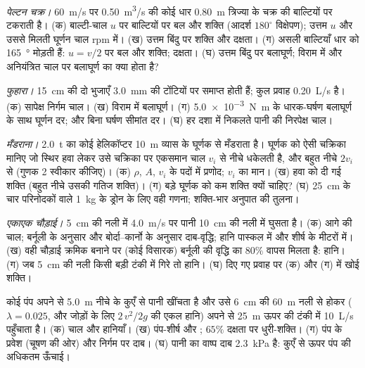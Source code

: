\begin{exercise}[$\star\star$]\label{exo:b2:flow-balances:5}
\emph{पेल्टन चक्र।} \qty{60}{m/s} पर \qty{0.50}{m^3/s} की कोई धार
\qty{0.80}{m} त्रिज्या के चक्र की बाल्टियों पर टकराती है। (क) बाल्टी-चाल $u$ पर
बाल्टियों पर बल और शक्ति (आदर्श $180^\circ$ विक्षेपण); उत्तम $u$
और उससे मिलती घूर्णन चाल \unit{rpm} में। (ख) उत्तम बिंदु पर शक्ति और दक्षता।
(ग) असली बाल्टियाँ धार को \qty{165}{\degree} मोड़ती हैं:
$u = v/2$ पर बल और शक्ति; दक्षता। (घ) उत्तम बिंदु पर बलाघूर्ण;
विराम में और अनियंत्रित चाल पर बलाघूर्ण का क्या होता है?
\end{exercise}

\begin{exercise}[$\star\star$]\label{exo:b2:flow-balances:6}
\emph{फुहारा।} \qty{15}{cm} की दो भुजाएँ \qty{3.0}{mm} की टोंटियों पर समाप्त होती हैं;
कुल प्रवाह \qty{0.20}{L/s} है। (क) सापेक्ष निर्गम चाल। (ख) विराम में
बलाघूर्ण। (ग) \qty{5.0e-3}{N.m} के धारक-घर्षण बलाघूर्ण के साथ
घूर्णन दर; और बिना घर्षण सीमांत दर। (घ) हर दशा में निकलते
पानी की निरपेक्ष चाल।
\end{exercise}

\begin{exercise}[$\star\star$]\label{exo:b2:flow-balances:7}
\emph{मँडराना।} \qty{2.0}{t} का कोई हेलिकॉप्टर \qty{10}{m} व्यास के
घूर्णक से मँडराता है। घूर्णक को ऐसी चक्रिका मानिए जो स्थिर हवा लेकर
उसे चक्रिका पर एकसमान चाल $v_i$ से नीचे धकेलती है, और बहुत नीचे $2v_i$ से
(गुणक 2 स्वीकार कीजिए)। (क) $\rho$, $A$, $v_i$ के पदों में प्रणोद;
$v_i$ का मान। (ख) हवा को दी गई शक्ति (बहुत नीचे उसकी गतिज
शक्ति)। (ग) बड़े घूर्णक को कम शक्ति क्यों चाहिए? (घ) \qty{25}{cm} के चार
परिनोदकों वाले \qty{1}{kg} के ड्रोन के लिए वही गणना;
शक्ति-भार अनुपात की तुलना।
\end{exercise}

\begin{exercise}[$\star\star$]\label{exo:b2:flow-balances:8}
\emph{एकाएक चौड़ाई।} \qty{5}{cm} की नली में \qty{4.0}{m/s} पर पानी
\qty{10}{cm} की नली में घुसता है। (क) आगे की चाल; बर्नूली के अनुसार और
बोर्दा--कार्नो के अनुसार दाब-वृद्धि; हानि पास्कल में और शीर्ष के
मीटरों में। (ख) वही चौड़ाई क्रमिक बनाने पर (कोई विसारक) बर्नूली की वृद्धि का $80\%$
वापस मिलता है: हानि। (ग) जब \qty{5}{cm} की नली किसी बड़ी टंकी में
गिरे तो हानि। (घ) दिए गए प्रवाह पर (क) और (ग) में खोई शक्ति।
\end{exercise}

\begin{exercise}[$\star\star$]\label{exo:b2:flow-balances:9}
कोई पंप अपने से \qty{5.0}{m} नीचे के कुएँ से पानी खींचता है और उसे
\qty{6}{cm} की \qty{60}{m} नली से होकर ($\lambda = 0.025$, और जोड़ों के लिए $2\,v^2/2g$ की एकल हानि) अपने से \qty{25}{m} ऊपर की टंकी में
\qty{10}{L/s} पहुँचाता है।
(क) चाल और हानियाँ। (ख) पंप-शीर्ष और ; $65\%$ दक्षता
पर धुरी-शक्ति। (ग) पंप के प्रवेश (चूषण की ओर) और निर्गम पर दाब।
(घ) पानी का वाष्प दाब \qty{2.3}{kPa} है: कुएँ से ऊपर पंप की अधिकतम
ऊँचाई।
\end{exercise}

